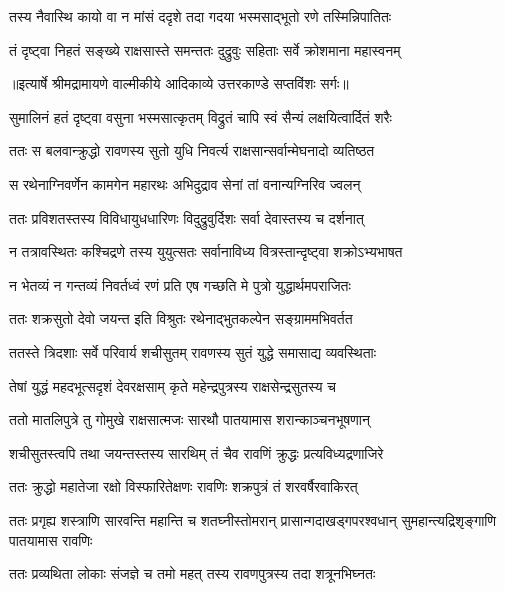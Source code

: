 \twolineshloka
{तस्य नैवास्थि कायो वा न मांसं ददृशे तदा}
{गदया भस्मसाद्भूतो रणे तस्मिन्निपातितः} %

\twolineshloka
{तं दृष्ट्वा निहतं सङ्ख्ये राक्षसास्ते समन्ततः}
{दुद्रुवुः सहिताः सर्वे क्रोशमाना महास्वनम्} %


{॥इत्यार्षे श्रीमद्रामायणे वाल्मीकीये आदिकाव्ये उत्तरकाण्डे सप्तविंशः सर्गः॥}


\twolineshloka
{सुमालिनं हतं दृष्ट्वा वसुना भस्मसात्कृतम्}
{विद्रुतं चापि स्वं सैन्यं लक्षयित्वार्दितं शरैः} %

\twolineshloka
{ततः स बलवान्क्रुद्धो रावणस्य सुतो युधि}
{निवर्त्य राक्षसान्सर्वान्मेघनादो व्यतिष्ठत} %

\twolineshloka
{स रथेनाग्निवर्णेन कामगेन महारथः}
{अभिदुद्राव सेनां तां वनान्यग्निरिव ज्वलन्} %

\twolineshloka
{ततः प्रविशतस्तस्य विविधायुधधारिणः}
{विदुद्रुवुर्दिशः सर्वा देवास्तस्य च दर्शनात्} %

\twolineshloka
{न तत्रावस्थितः कश्चिद्रणे तस्य युयुत्सतः}
{सर्वानाविध्य वित्रस्तान्दृष्ट्वा शक्रोऽभ्यभाषत} %

\twolineshloka
{न भेतव्यं न गन्तव्यं निवर्तध्वं रणं प्रति}
{एष गच्छति मे पुत्रो युद्धार्थमपराजितः} %

\twolineshloka
{ततः शक्रसुतो देवो जयन्त इति विश्रुतः}
{रथेनाद्भुतकल्पेन सङ्ग्राममभिवर्तत} %

\twolineshloka
{ततस्ते त्रिदशाः सर्वे परिवार्य शचीसुतम्}
{रावणस्य सुतं युद्धे समासाद्य व्यवस्थिताः} %

\twolineshloka
{तेषां युद्धं महदभूत्सदृशं देवरक्षसाम्}
{कृते महेन्द्रपुत्रस्य राक्षसेन्द्रसुतस्य च} %

\twolineshloka
{ततो मातलिपुत्रे तु गोमुखे राक्षसात्मजः}
{सारथौ पातयामास शरान्काञ्चनभूषणान्} %

\twolineshloka
{शचीसुतस्त्वपि तथा जयन्तस्तस्य सारथिम्}
{तं चैव रावणिं क्रुद्धः प्रत्यविध्यद्रणाजिरे} %

\twolineshloka
{ततः क्रुद्धो महातेजा रक्षो विस्फारितेक्षणः}
{रावणिः शक्रपुत्रं तं शरवर्षैरवाकिरत्} %

\threelineshloka
{ततः प्रगृह्य शस्त्राणि सारवन्ति महान्ति च}
{शतघ्नीस्तोमरान् प्रासान्गदाखड्गपरश्वधान्}
{सुमहान्त्यद्रिशृङ्गाणि पातयामास रावणिः} %

\twolineshloka
{ततः प्रव्यथिता लोकाः संजज्ञे च तमो महत्}
{तस्य रावणपुत्रस्य तदा शत्रूनभिघ्नतः} %

